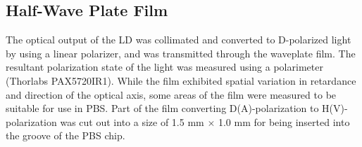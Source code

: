 \documentclass[letterpaper, 10pt]{article}
\begin{document}
\subsection{Half-Wave Plate Film}
The optical output of the LD  was collimated and converted to D-polarized light by using a linear polarizer, and was transmitted through the waveplate film.
The resultant polarization state of the light was measured using a polarimeter (Thorlabs PAX5720IR1).
While the film exhibited spatial variation in retardance and direction of the optical axis, some areas of the film were measured to be suitable for use in PBS.
Part of the film converting D(A)-polarization to H(V)-polarization was cut out into a size of 1.5 mm $\times$ 1.0 mm for being inserted into the groove of the PBS chip.
\end{document}
